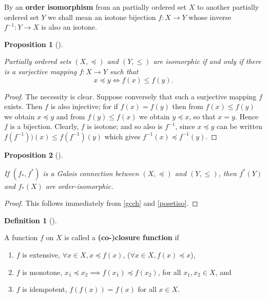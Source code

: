 \documentclass[
  twoside,
  12pt,
  letterpaper,
  fleqn]{article}
\providecommand{\tightlist}{%
  \setlength{\itemsep}{0pt}\setlength{\parskip}{0pt}}\usepackage{longtable,booktabs,array}
\theoremstyle{plain}
\newtheorem{proposition}{Proposition}[section]
\theoremstyle{definition}
\theoremstyle{definition}
\newtheorem{definition}{Definition}[section]
\theoremstyle{remark}
\begin{document}
By an \textbf{order isomorphism} from an partially ordered set \(X\) to
another partially ordered set \(Y\) we shall mean an isotone bijection
\(f:X\to Y\) whose inverse \(f^{-1}: Y\to X\) is also an isotone.

\begin{proposition}[]\protect\hypertarget{prp-isomorphic-ordered-sets}{}\label{prp-isomorphic-ordered-sets}

Partially ordered sets \((X,\preceq)\) and \((Y,\leqslant)\) are
isomorphic if and only if there is a surjective mapping \(f:X\to Y\)
such that \[
x\preceq y \Longleftrightarrow f(x)\leqslant f(y).
\]

\end{proposition}

\begin{proof}

The necessity is clear. Suppose conversely that such a surjective
mapping \(f\) exists. Then \(f\) is also injective; for if \(f(x)=f(y)\)
then from \(f(x)\leqslant f(y)\) we obtain \(x\preceq y\) and from
\(f(y)\leqslant f(x)\) we obtain \(y\preceq x\), so that \(x=y\). Hence
\(f\) is a bijection. Clearly, \(f\) is isotone; and so also is
\(f^{-1}\), since \(x\preceq y\) can be written
\(f(f^{-1}))(x)\leqslant f(f^{-1})(y)\) which gives
\(f^{-1}(x)\preceq f^{-1}(y)\).

\end{proof}

\begin{proposition}[]\protect\hypertarget{prp-galois-connection-order-isomorphic}{}\label{prp-galois-connection-order-isomorphic}

\label{calcprop1} If \((f_*, f^*)\) is a Galois connection between
\((X,\preceq)\) and \((Y,\leqslant)\), then \(f^*(Y)\) and \(f_*(X)\)
are order-isomorphic.

\end{proposition}

\begin{proof}

This follows immediately from \eqref{gcch} and \eqref{posetiso}.

\end{proof}

\begin{definition}[]\protect\hypertarget{def-closure-function}{}\label{def-closure-function}

A function \(f\) on \(X\) is called a \textbf{(co-)closure function} if

\begin{enumerate}
\def\labelenumi{\arabic{enumi}.}
\tightlist
\item
  \(f\) is extensive, \(\forall x\in X, x\preceq f(x)\),
  (\(\forall x\in X, f(x)\preceq x\)),
\item
  \(f\) is monotone, \(x_1\preceq x_2\implies f(x_1)\preceq f(x_2)\),
  for all \(x_1, x_2\in X\), and
\item
  \(f\) is idempotent, \(f(f(x))=f(x)\) for all \(x\in X\).
\end{enumerate}

\end{definition}
\end{document}
